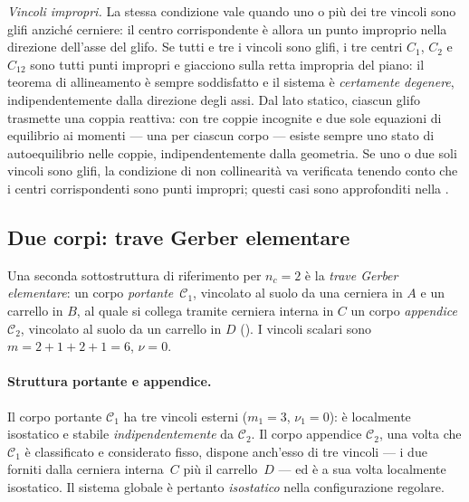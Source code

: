 \begin{oss}
	\smallskip
	\noindent\textit{Vincoli impropri.}
	La stessa condizione vale quando uno o più dei tre
	vincoli sono glifi anziché cerniere: il centro
	corrispondente è allora un punto improprio nella
	direzione dell'asse del glifo. Se tutti e tre i
	vincoli sono glifi, i tre centri $C_1$, $C_2$ e
	$C_{12}$ sono tutti punti impropri e giacciono
	sulla retta impropria del piano: il teorema di
	allineamento è sempre soddisfatto e il sistema
	è \emph{certamente degenere}, indipendentemente
	dalla direzione degli assi. Dal lato statico,
	ciascun glifo trasmette una coppia reattiva:
	con tre coppie incognite e due sole equazioni
	di equilibrio ai momenti --- una per ciascun
	corpo --- esiste sempre uno stato di
	autoequilibrio nelle coppie, indipendentemente
	dalla geometria. Se uno o due soli vincoli sono
	glifi, la condizione di non collinearità va
	verificata tenendo conto che i centri
	corrispondenti sono punti impropri; questi casi
	sono approfonditi nella .
\end{oss}





\subsection{Due corpi: trave Gerber elementare}
\label{sec:catalogo_gerber}

Una seconda sottostruttura di riferimento per $n_c = 2$ è la
\emph{trave Gerber elementare}:
un corpo \emph{portante}~$\mathcal{C}_1$, vincolato al suolo da una
cerniera in $A$ e un carrello in $B$, al quale si collega tramite
cerniera interna in $C$ un corpo \emph{appendice}~$\mathcal{C}_2$,
vincolato al suolo da un carrello in $D$
().
I vincoli scalari sono $m = 2+1+2+1 = 6$, $\nu = 0$.



\paragraph{Struttura portante e appendice.}
Il corpo portante $\mathcal{C}_1$ ha tre vincoli esterni
($m_1 = 3$, $\nu_1 = 0$): è localmente isostatico e stabile
\emph{indipendentemente} da $\mathcal{C}_2$.
Il corpo appendice $\mathcal{C}_2$, una volta che $\mathcal{C}_1$
è classificato e considerato fisso, dispone anch'esso di tre vincoli
--- i due forniti dalla cerniera interna~$C$ più il carrello~$D$ ---
ed è a sua volta localmente isostatico.
Il sistema globale è pertanto \textit{isostatico}
nella configurazione regolare.


